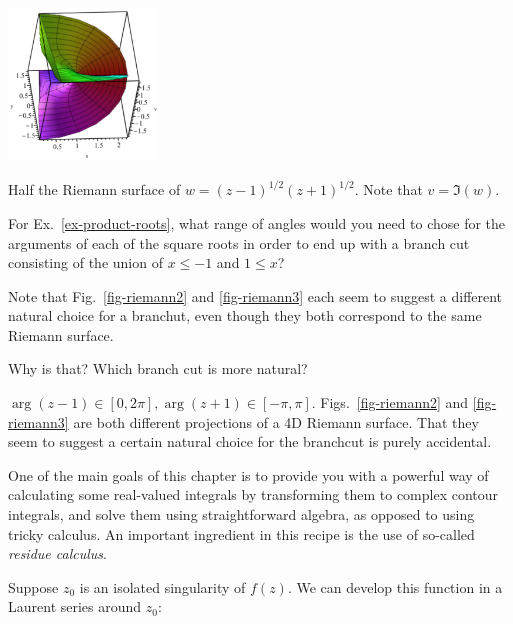 \begin{exer}
\begin{marginfigure}[0.cm]
\centering
\includegraphics[width=4cm]{complex/figures/riemann3}
\caption{Half the Riemann surface of $w=(z-1)^{1/2}(z+1)^{1/2}$. Note that $v=\Im(w)$. }
\label{fig-riemann3}
\end{marginfigure}

For Ex.~\ref{ex-product-roots}, what range of angles would you need to chose for the arguments of each of the square roots in order to end up with a branch cut consisting of the union of  $x \le -1$ and $1 \le x$?


Note that Fig.~\ref{fig-riemann2} and \ref{fig-riemann3} each seem to suggest a different natural choice for a branchut, even though they both correspond to the same Riemann surface.


Why is that? Which branch cut is more natural?
  \begin{sol}
    $\arg(z-1) \in [0, 2 \pi], \arg(z+1) \in [-\pi,\pi]$. Figs.~\ref{fig-riemann2} and \ref{fig-riemann3} are both different projections of a 4D Riemann surface. That they seem to suggest a certain natural choice for the branchcut is purely accidental.
\end{sol}
\end{exer}

\pagebreak



One of the main goals of this chapter is to provide you with a powerful way of calculating some real-valued integrals by transforming them to complex contour integrals, and solve them using straightforward algebra, as opposed to using tricky calculus. An important ingredient in this recipe is the use of so-called \emph{residue calculus}.


Suppose $z_0$ is an isolated singularity of $f(z)$. We can develop this function in a Laurent series around $z_0$:


